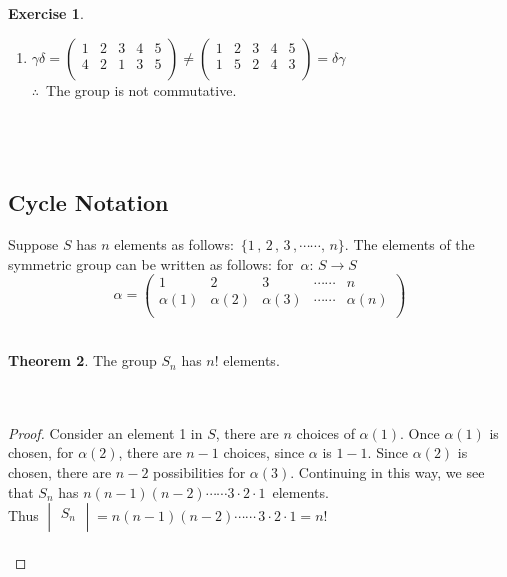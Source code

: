 \documentclass[11pt,a4paper]{article}
\theoremstyle{definition}
\newtheorem{thm}{Theorem}[subsection]
\newtheorem{exe}[thm]{Exercise}
\begin{document}
\begin{exe}
\begin{enumerate}
\item[(d)] $\gamma \delta = \begin{pmatrix}
1 & 2 & 3 & 4 & 5\\
4 & 2 & 1 & 3 & 5\\
\end{pmatrix} \neq \begin{pmatrix}
1 & 2 & 3 & 4 & 5\\
1 & 5 & 2 & 4 & 3\\
\end{pmatrix} = \delta \gamma$\\

$\therefore\,$ The group is not commutative.\\\\\\\\
\end{enumerate}
\end{exe}







\subsection{Cycle Notation}
Suppose $S$ has $n$ elements as follows: $\, \{1\, , \, 2\, , \, 3\, ,\cdots\cdots, \, n\}$. The elements of the symmetric group can be written as follows: for $\, \alpha :\, S\longrightarrow S$ 
$$\alpha = \begin{pmatrix}
1 & 2 & 3 & \cdots\cdots & n\\
\alpha(1) & \alpha(2) & \alpha(3) & \cdots\cdots & \alpha(n)\\
\end{pmatrix}$$\\




\begin{thm}
The group $S_n$ has $n!$ elements.\\\\\\
\end{thm}

\begin{proof}
Consider an element 1 in $S$, there are $n$ choices of $\alpha(1)$. Once $\alpha(1)$ is chosen, for $\alpha(2)$, there are $n-1$ choices, since $\alpha$ is $1-1$. Since $\alpha(2)$ is chosen, there are $n-2$ possibilities for $\alpha(3)$. Continuing in this way, we see that $S_n$ has $n(n-1)(n-2)\cdots\cdots 3\cdot 2\cdot 1\, $ elements.\\

Thus $\begin{vmatrix}
S_n\\
\end{vmatrix} = n(n-1)(n-2)\cdots\cdots\, 3\cdot 2\cdot 1 = n!$\\\\
\end{proof}
\end{document}
